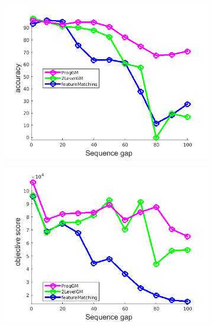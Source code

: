 \documentclass[
	fontsize=12pt,
	paper=a4,
	twoside=false,
	numbers=noenddot,
	plainheadsepline,
	toc=listof,
	toc=bibliography
]{scrartcl}
\begin{document}
\begin{figure}[h] 
	\begin{subfigure}[b]{0.3\textwidth}
		\centering
		\includegraphics[scale=0.25]{"fig_ver2608/RealImages/HouseSeq/no_descr/using_cpd_afftrafo/ext_solution/performance/accuracy"} 
	\end{subfigure}%
	\begin{subfigure}[b]{0.3\textwidth}
		\centering
		\includegraphics[scale=0.25]{"fig_ver2608/RealImages/HouseSeq/no_descr/using_cpd_afftrafo/ext_solution/performance/score"}  
	\end{subfigure} 
	\begin{subfigure}[b]{0.3\textwidth}
		\centering

\end{subfigure}
\end{figure}
\end{document}
